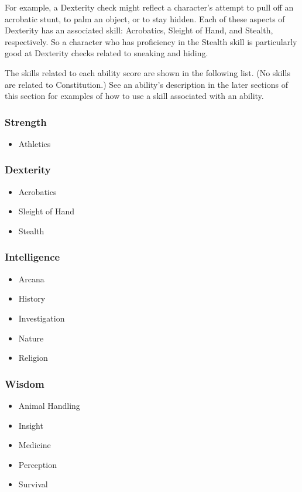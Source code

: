 For example, a Dexterity check might reflect a character's attempt to pull off an acrobatic stunt, to palm an object, or to stay hidden. Each of these aspects of Dexterity has an associated skill: Acrobatics, Sleight of Hand, and Stealth, respectively. So a character who has proficiency in the Stealth skill is particularly good at Dexterity checks related to sneaking and hiding.

The skills related to each ability score are shown in the following list. (No skills are related to Constitution.) See an ability's description in the later sections of this section for examples of how to use a skill associated with an ability.

\subsubsection{Strength}

\begin{itemize}
\item Athletics
\end{itemize}

\subsubsection{Dexterity}

\begin{itemize}
\item Acrobatics
\item Sleight of Hand
\item Stealth
\end{itemize}

\subsubsection{Intelligence}

\begin{itemize}
\item Arcana
\item History
\item Investigation
\item Nature
\item Religion
\end{itemize}

\subsubsection{Wisdom}

\begin{itemize}
\item Animal Handling
\item Insight
\item Medicine
\item Perception
\item Survival
\end{itemize}


